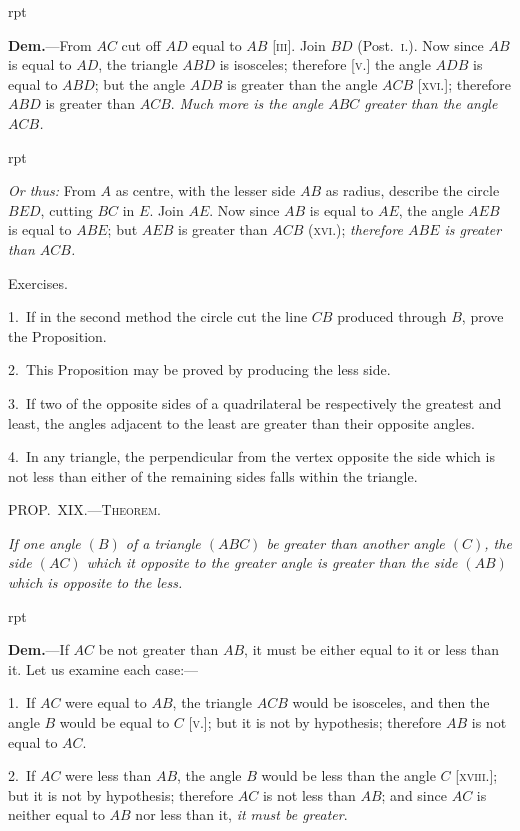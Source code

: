 \documentclass[oneside]{book}
\newcounter{wrapwidth}
\newcommand\mypropl[2]{
\bigskip\Needspace*{4\baselineskip}\begin{center}\textsc{#1}\end{center}
\hspace{\parindent}\emph{#2}\par\medskip
}
\newcommand\exhead[1]{
\Needspace*{5\baselineskip}\begin{center}
\textsf{#1}
\end{center}
}
\newcommand\imgflow[3]{
\setcounter{wrapwidth}{#1}

\begin{wrapfigure}[#2]{r}{\value{wrapwidth}pt}
\begin{center}
\vspace{-0.3in}

\end{center}
\end{wrapfigure}
}
\begin{document}
\imgflow{133}{7}{f033}

\textbf{Dem.}---From $AC$ cut off $AD$ equal to $AB$ [\textsc{iii}].
Join $BD$ (Post.~\textsc{i.}). Now
since $AB$ is equal to $AD$, the
triangle $ABD$ is isosceles;
therefore [\textsc{v.}] the angle $ADB$
is equal to $ABD$; but the angle
$ADB$ is greater than the angle
$ACB$ [\textsc{xvi.}]; therefore $ABD$
is greater than $ACB$.  \textit{Much more is the angle $ABC$
greater than the angle $ACB$.}


\imgflow{133}{6}{f034}

\textit{Or thus:} From $A$ as centre,
with the lesser side $AB$ as radius,
describe the circle $BED$,
cutting $BC$ in $E$. Join $AE$.
Now since $AB$ is equal to $AE$,
the angle $AEB$ is equal to
$ABE$; but $AEB$ is greater than
$ACB$ (\textsc{xvi}.); \textit{therefore $ABE$ is greater than $ACB$.}

\exhead{Exercises.}

\begin{footnotesize}
1.~If in the second method the circle cut the line $CB$ produced
through $B$, prove the Proposition.

2.~This Proposition may be proved by producing the less side.

3.~If two of the opposite sides of a quadrilateral be respectively
the greatest and least, the angles adjacent to the least are greater
than their opposite angles.

4.~In any triangle, the perpendicular from the vertex opposite
the side which is not less than either of the remaining sides falls
within the triangle.
\par\end{footnotesize}



\mypropl{PROP\@.~XIX\@.---Theorem.}{If one angle $(B)$ of a triangle $(ABC)$ be greater than
another angle $(C)$, the side $(AC)$ which it opposite to the
greater angle is greater than the side $(AB)$ which is opposite
to the less.}


\imgflow{115}{8}{f035}

\textbf{Dem.}---If $AC$ be not greater than $AB$, it must be
either equal to it or less than it.
Let us examine each case:---

1.~If $AC$ were equal to $AB$,
the triangle $ACB$ would be
isosceles, and then the angle $B$
would be equal to $C$ [\textsc{v}.]; but it
is not by hypothesis; therefore
$AB$ is not equal to $AC$.

2.~If $AC$ were less than $AB$, the angle $B$ would be
less than the angle $C$ [\textsc{xviii}.]; but it is not by hypothesis;
therefore $AC$ is not less than $AB$; and since $AC$ is
neither equal to $AB$ nor less than it, \emph{it must be greater}.
\end{document}
